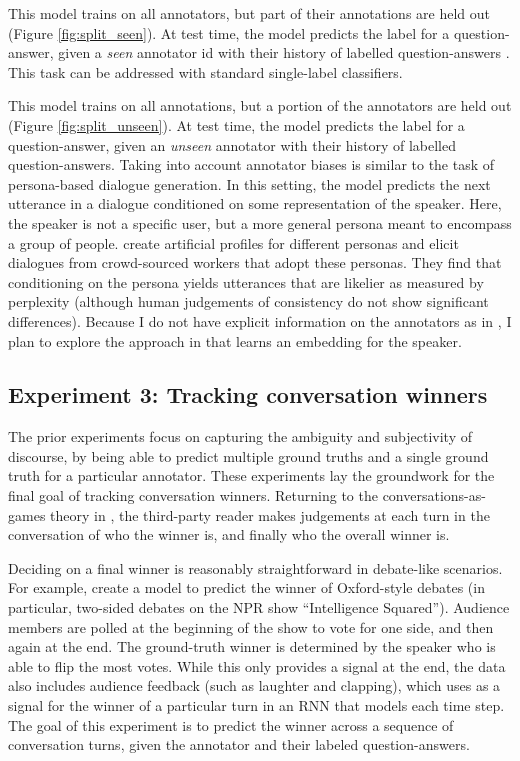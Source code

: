  This model trains on all annotators, but part of their annotations are held out (Figure \ref{fig:split_seen}). At test time, the model predicts the label for a question-answer, given a \emph{seen} annotator id with their history of labelled question-answers . This task can be addressed with standard single-label classifiers.

 This model trains on all annotations, but a portion of the annotators are held out (Figure \ref{fig:split_unseen}). At test time, the model predicts the label for a question-answer, given an \emph{unseen} annotator with their history of labelled question-answers. Taking into account annotator biases is similar to the task of persona-based dialogue generation. In this setting, the model predicts the next utterance in a dialogue conditioned on some representation of the speaker. Here, the speaker is not a specific user, but a more general persona meant to encompass a group of people. \citet{Zhang:2018} create artificial profiles for different personas and elicit dialogues from crowd-sourced workers that adopt these personas. They find that conditioning on the persona yields utterances that are likelier as measured by perplexity (although human judgements of consistency do not show significant differences). Because I do not have explicit information on the annotators as in \citet{Zhang:2018}, I plan to explore the approach in \citet{Li:2016} that learns an embedding for the speaker.

\subsection{Experiment 3: Tracking conversation winners} 
The prior experiments focus on capturing the ambiguity and subjectivity of discourse, by being able to predict multiple ground truths and a single ground truth for a particular annotator. These experiments lay the groundwork for the final goal of tracking conversation winners. Returning to the conversations-as-games theory in \citet{Asher:2018}, the third-party reader makes judgements at each turn in the conversation of who the winner is, and finally who the overall winner is. 

Deciding on a final winner is reasonably straightforward in debate-like scenarios. For example, \citet{Zhang:2016} create a model to predict the winner of Oxford-style debates (in particular, two-sided debates on the NPR show ``Intelligence Squared''). Audience members are polled at the beginning of the show to vote for one side, and then again at the end. The ground-truth winner is determined by the speaker who is able to flip the most votes. While this only provides a signal at the end, the data also includes audience feedback (such as laughter and clapping), which \citet{Potash:2017} uses as a signal for the winner of a particular turn in an RNN that models each time step.  
The goal of this experiment is to predict the winner across a sequence of conversation turns, given the annotator and their labeled question-answers.


